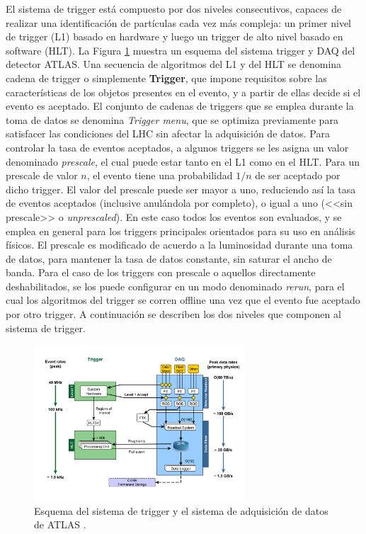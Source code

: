El sistema de trigger está compuesto por dos niveles consecutivos, capaces de realizar una identificación de partículas cada vez más compleja: un primer nivel de trigger (L1) basado en hardware y luego un trigger de alto nivel basado en software (HLT). La Figura \ref{fig:tdaq} muestra un esquema del sistema trigger y DAQ del detector ATLAS. Una secuencia de algoritmos del L1 y del HLT se denomina cadena de trigger o simplemente \textbf{Trigger}, que impone requisitos sobre las características de los objetos presentes en el evento, y a partir de ellas decide si el evento es aceptado. El conjunto de cadenas de triggers que se emplea durante la toma de datos se denomina \textit{Trigger menu}, que se optimiza previamente para satisfacer las condiciones del LHC sin afectar la adquisición de datos. Para controlar la tasa de eventos aceptados, a algunos triggers se les asigna un valor denominado \textit{prescale}, el cual puede estar tanto en el L1 como en el HLT. Para un prescale de valor $n$, el evento tiene una probabilidad $1/n$ de ser aceptado por dicho trigger. El valor del prescale puede ser mayor a uno, reduciendo así la tasa de eventos aceptados (inclusive anulándola por completo), o igual a uno (<<sin prescale>> o \textit{unprescaled}). En este caso todos los eventos son evaluados, y se emplea en general para los triggers principales orientados para su uso en análisis físicos. El prescale es modificado de acuerdo a la luminosidad durante una toma de datos, para mantener la tasa de datos constante, sin saturar el ancho de banda. Para el caso de los triggers con prescale o aquellos directamente deshabilitados, se los puede configurar en un modo denominado \textit{rerun}, para el cual los algoritmos del trigger se corren offline una vez que el evento fue aceptado por otro trigger. A continuación se describen los dos niveles que componen al sistema de trigger.

\begin{figure}
  \centering
  \includegraphics[width=0.7\textwidth]{images/lhc/tdaqFullNew2017.pdf}
  \caption{Esquema del sistema de trigger y el sistema de adquisición de datos de ATLAS \cite{tdaq_plot}.}
  \label{fig:tdaq}
\end{figure}

